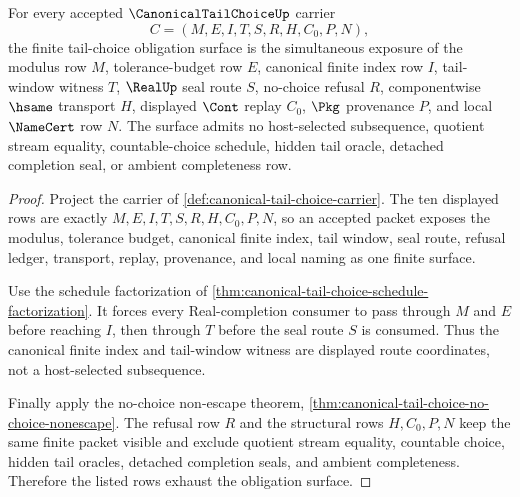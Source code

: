 \begin{theorem}
\label{thm:canonical-tail-choice-obligation-surface}
For every accepted $\CanonicalTailChoiceUp$ carrier
$$
C=(M,E,I,T,S,R,H,C_0,P,N),
$$
the finite tail-choice obligation surface is the simultaneous exposure of the modulus row $M$, tolerance-budget row $E$, canonical finite index row $I$, tail-window witness $T$, $\RealUp$ seal route $S$, no-choice refusal $R$, componentwise $\hsame$ transport $H$, displayed $\Cont$ replay $C_0$, $\Pkg$ provenance $P$, and local $\NameCert$ row $N$. The surface admits no host-selected subsequence, quotient stream equality, countable-choice schedule, hidden tail oracle, detached completion seal, or ambient completeness row.
\end{theorem}
\begin{proof}
Project the carrier of \autoref{def:canonical-tail-choice-carrier}. The ten displayed rows are exactly $M,E,I,T,S,R,H,C_0,P,N$, so an accepted packet exposes the modulus, tolerance budget, canonical finite index, tail window, seal route, refusal ledger, transport, replay, provenance, and local naming as one finite surface.

Use the schedule factorization of \autoref{thm:canonical-tail-choice-schedule-factorization}. It forces every Real-completion consumer to pass through $M$ and $E$ before reaching $I$, then through $T$ before the seal route $S$ is consumed. Thus the canonical finite index and tail-window witness are displayed route coordinates, not a host-selected subsequence.

Finally apply the no-choice non-escape theorem, \autoref{thm:canonical-tail-choice-no-choice-nonescape}. The refusal row $R$ and the structural rows $H,C_0,P,N$ keep the same finite packet visible and exclude quotient stream equality, countable choice, hidden tail oracles, detached completion seals, and ambient completeness. Therefore the listed rows exhaust the obligation surface.
\end{proof}

